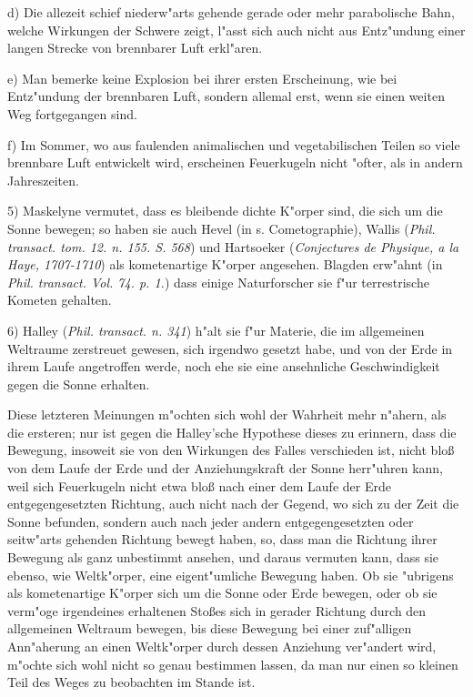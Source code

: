 \documentclass[a4paper, 11pt, oneside, polutonikogreek, german]{article}
\begin{document}
d) Die allezeit schief niederw"arts gehende gerade oder mehr parabolische Bahn, welche Wirkungen der Schwere zeigt, l"asst sich auch nicht aus Entz"undung einer langen Strecke von brennbarer Luft erkl"aren.

e) Man bemerke keine Explosion bei ihrer ersten Erscheinung, wie bei Entz"undung der brennbaren Luft, sondern allemal erst, wenn sie einen weiten Weg fortgegangen sind.

f) Im Sommer, wo aus faulenden animalischen und vegetabilischen Teilen so viele brennbare Luft entwickelt wird, erscheinen Feuerkugeln nicht "ofter, als in andern Jahreszeiten.

5) Maskelyne vermutet, dass es bleibende dichte K"orper sind, die sich um die Sonne bewegen; so haben sie auch Hevel (in s. Cometographie), Wallis (\emph{Phil. transact. tom. 12. n. 155. S. 568}) und Hartsoeker (\emph{Conjectures de Physique, a la Haye, 1707-1710}) als kometenartige K"orper angesehen. Blagden erw"ahnt (in \emph{Phil. transact. Vol. 74. p. 1.}) dass einige Naturforscher sie f"ur terrestrische Kometen gehalten.

6) Halley (\emph{Phil. transact. n. 341}) h"alt sie f"ur Materie, die im allgemeinen Weltraume zerstreuet gewesen, sich irgendwo gesetzt habe, und von der Erde in ihrem Laufe angetroffen werde, noch ehe sie eine ansehnliche Geschwindigkeit gegen die Sonne erhalten.

Diese letzteren Meinungen m"ochten sich wohl der Wahrheit mehr n"ahern, als die ersteren; nur ist gegen die Halley'sche Hypothese dieses zu erinnern, dass die Bewegung, insoweit sie von den Wirkungen des Falles verschieden ist, nicht bloß von dem Laufe der Erde und der Anziehungskraft der Sonne herr"uhren kann, weil sich Feuerkugeln nicht etwa bloß nach einer dem Laufe der Erde entgegengesetzten Richtung, auch nicht nach der Gegend, wo sich zu der Zeit die Sonne befunden, sondern auch nach jeder andern entgegengesetzten oder seitw"arts gehenden Richtung bewegt haben, so, dass man die Richtung ihrer Bewegung als ganz unbestimmt ansehen, und daraus vermuten kann, dass sie ebenso, wie Weltk"orper, eine eigent"umliche Bewegung haben. Ob sie "ubrigens als kometenartige K"orper sich um die Sonne oder Erde bewegen, oder ob sie verm"oge irgendeines erhaltenen Stoßes sich in gerader Richtung durch den allgemeinen Weltraum bewegen, bis diese Bewegung bei einer zuf"alligen Ann"aherung an einen Weltk"orper durch dessen Anziehung ver"andert wird, m"ochte sich wohl nicht so genau bestimmen lassen, da man nur einen so kleinen Teil des Weges zu beobachten im Stande ist.
\end{document}
